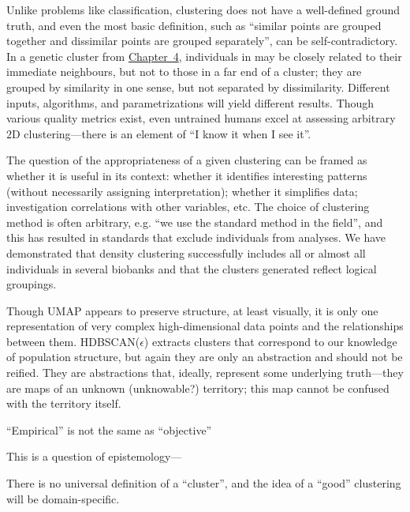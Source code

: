 Unlike problems like classification, clustering does not have a well-defined ground truth, and even the most basic definition, such as ``similar points are grouped together and dissimilar points are grouped separately'', can be self-contradictory\citep{ben-david_clustering_2018}. In a genetic cluster from \hyperref[chap:chapter4]{Chapter~4}, individuals in may be closely related to their immediate neighbours, but not to those in a far end of a cluster; they are grouped by similarity in one sense, but not separated by dissimilarity. Different inputs, algorithms, and parametrizations will yield different results. Though various quality metrics exist, even untrained humans excel at assessing arbitrary $2$D clustering\citep{lewis_human_2012}---there is an element of ``I know it when I see it''. 

The question of the appropriateness of a given clustering can be framed as whether it is useful in its context: whether it identifies interesting patterns (without necessarily assigning interpretation); whether it simplifies data; investigation correlations with other variables, etc\citep{hennig_what_2015}. The choice of clustering method is often arbitrary, e.g. ``we use the standard method in the field''\citep{ben-david_clustering_2018}, and this has resulted in standards that exclude individuals from analyses\citep{ding_polygenic_2023}. We have demonstrated that density clustering successfully includes all or almost all individuals in several biobanks and that the clusters generated reflect logical groupings.
\citep{hennig_what_2015}

Though UMAP appears to preserve structure, at least visually, it is only one representation of very complex high-dimensional data points and the relationships between them. HDBSCAN($\hat{\epsilon}$) extracts clusters that correspond to our knowledge of population structure, but again they are only an abstraction and should not be reified. They are abstractions that, ideally, represent some underlying truth---they are maps of an unknown (unknowable?) territory; this map cannot be confused with the territory itself. 



``Empirical'' is not the same as ``objective''

\citep{lewis_human_2012}

This is a question of epistemology---

There is no universal definition of a ``cluster'', and the idea of a ``good'' clustering will be domain-specific\citep{hennig_what_2015}.

